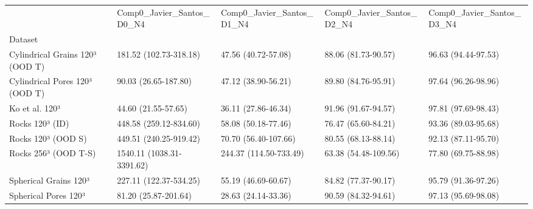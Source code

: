 \begin{tabular}{lllll}
\toprule
 & Comp0_Javier_Santos_D0_N4 & Comp0_Javier_Santos_D1_N4 & Comp0_Javier_Santos_D2_N4 & Comp0_Javier_Santos_D3_N4 \\
Dataset &  &  &  &  \\
\midrule
Cylindrical Grains 120³ (OOD T) & 181.52 (102.73-318.18) & 47.56 (40.72-57.08) & 88.06 (81.73-90.57) & 96.63 (94.44-97.53) \\
Cylindrical Pores 120³ (OOD T) & 90.03 (26.65-187.80) & 47.12 (38.90-56.21) & 89.80 (84.76-95.91) & 97.64 (96.26-98.96) \\
Ko et al. 120³ & 44.60 (21.55-57.65) & 36.11 (27.86-46.34) & 91.96 (91.67-94.57) & 97.81 (97.69-98.43) \\
Rocks 120³ (ID) & 448.58 (259.12-834.60) & 58.08 (50.18-77.46) & 76.47 (65.60-84.21) & 93.36 (89.03-95.68) \\
Rocks 120³ (OOD S) & 449.51 (240.25-919.42) & 70.70 (56.40-107.66) & 80.55 (68.13-88.14) & 92.13 (87.11-95.70) \\
Rocks 256³ (OOD T-S) & 1540.11 (1038.31-3391.62) & 244.37 (114.50-733.49) & 63.38 (54.48-109.56) & 77.80 (69.75-88.98) \\
Spherical Grains 120³ & 227.11 (122.37-534.25) & 55.19 (46.69-60.67) & 84.82 (77.37-90.17) & 95.79 (91.36-97.26) \\
Spherical Pores 120³ & 81.20 (25.87-201.64) & 28.63 (24.14-33.36) & 90.59 (84.32-94.61) & 97.13 (95.69-98.08) \\
\bottomrule
\end{tabular}
